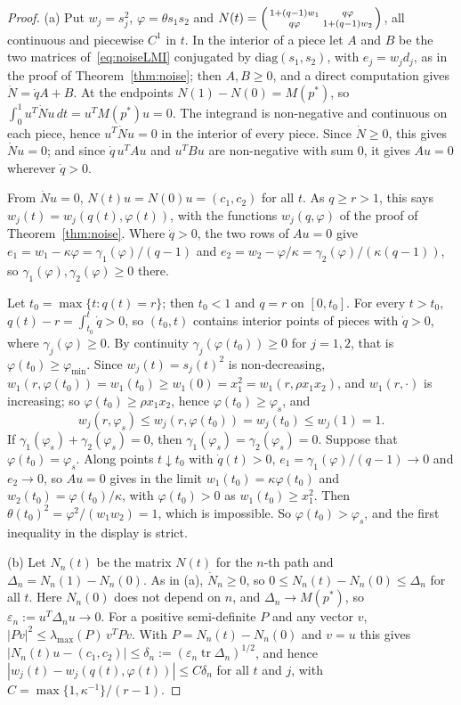\documentclass[11pt]{amsart}
\theoremstyle{definition}
\begin{document}
\begin{proof}
(a) Put $w_j=s_j^2$, $\varphi=\theta s_1s_2$ and
$N(t)=\begin{psmallmatrix}1+(q-1)w_1&q\varphi\\q\varphi&1+(q-1)w_2\end{psmallmatrix}$, all continuous and piecewise
$C^1$ in $t$. In the interior of a piece let $A$ and $B$ be the two matrices of~\eqref{eq:noiseLMI} conjugated by
$\mathrm{diag}(s_1,s_2)$, with $e_j=w_jd_j$, as in the proof of Theorem~\ref{thm:noise}; then $A,B\ge0$, and a direct
computation gives $\dot N=\dot qA+B$. At the endpoints $N(1)-N(0)=M(p^*)$, so
$\int_0^1u^T\dot N u\,dt=u^TM(p^*)u=0$. The integrand is non-negative and continuous on each piece, hence $u^T\dot Nu=0$
in the interior of every piece. Since $\dot N\ge0$, this gives $\dot Nu=0$; and since $\dot q\,u^TAu$ and $u^TBu$ are
non-negative with sum $0$, it gives $Au=0$ wherever $\dot q>0$.

From $\dot Nu=0$, $N(t)u=N(0)u=(c_1,c_2)$ for all $t$. As $q\ge r>1$, this says $w_j(t)=w_j(q(t),\varphi(t))$, with
the functions $w_j(q,\varphi)$ of the proof of Theorem~\ref{thm:noise}. Where $\dot q>0$, the two rows of $Au=0$ give
$e_1=w_1-\kappa\varphi=\gamma_1(\varphi)/(q-1)$ and $e_2=w_2-\varphi/\kappa=\gamma_2(\varphi)/(\kappa(q-1))$, so
$\gamma_1(\varphi),\gamma_2(\varphi)\ge0$ there.

Let $t_0=\max\{t:q(t)=r\}$; then $t_0<1$ and $q=r$ on $[0,t_0]$. For every $t>t_0$, $q(t)-r=\int_{t_0}^t\dot q>0$, so
$(t_0,t)$ contains interior points of pieces with $\dot q>0$, where $\gamma_j(\varphi)\ge0$. By continuity
$\gamma_j(\varphi(t_0))\ge0$ for $j=1,2$, that is $\varphi(t_0)\ge\varphi_{\min}$. Since $w_j(t)=s_j(t)^2$ is
non-decreasing, $w_1(r,\varphi(t_0))=w_1(t_0)\ge w_1(0)=x_1^2=w_1(r,\rho x_1x_2)$, and $w_1(r,\cdot)$ is increasing;
so $\varphi(t_0)\ge\rho x_1x_2$, hence $\varphi(t_0)\ge\varphi_s$, and
\[
w_j(r,\varphi_s)\le w_j(r,\varphi(t_0))=w_j(t_0)\le w_j(1)=1 .
\]
If $\gamma_1(\varphi_s)+\gamma_2(\varphi_s)=0$, then $\gamma_1(\varphi_s)=\gamma_2(\varphi_s)=0$. Suppose that
$\varphi(t_0)=\varphi_s$. Along points $t\downarrow t_0$ with $\dot q(t)>0$, $e_1=\gamma_1(\varphi)/(q-1)\to0$ and
$e_2\to0$, so $Au=0$ gives in the limit $w_1(t_0)=\kappa\varphi(t_0)$ and $w_2(t_0)=\varphi(t_0)/\kappa$, with
$\varphi(t_0)>0$ as $w_1(t_0)\ge x_1^2$. Then $\theta(t_0)^2=\varphi^2/(w_1w_2)=1$, which is impossible. So
$\varphi(t_0)>\varphi_s$, and the first inequality in the display is strict.

(b) Let $N_n(t)$ be the matrix $N(t)$ for the $n$-th path and $\Delta_n=N_n(1)-N_n(0)$. As in (a), $\dot N_n\ge0$, so
$0\le N_n(t)-N_n(0)\le\Delta_n$ for all $t$. Here $N_n(0)$ does not depend on $n$, and $\Delta_n\to M(p^*)$, so
$\varepsilon_n:=u^T\Delta_nu\to0$. For a positive semi-definite $P$ and any vector $v$,
$|Pv|^2\le\lambda_{\max}(P)\,v^TPv$. With $P=N_n(t)-N_n(0)$ and $v=u$ this gives
$|N_n(t)u-(c_1,c_2)|\le\delta_n:=(\varepsilon_n\operatorname{tr}\Delta_n)^{1/2}$, and hence
$|w_j(t)-w_j(q(t),\varphi(t))|\le C\delta_n$ for all $t$ and $j$, with $C=\max\{1,\kappa^{-1}\}/(r-1)$.


\end{proof}
\end{document}
